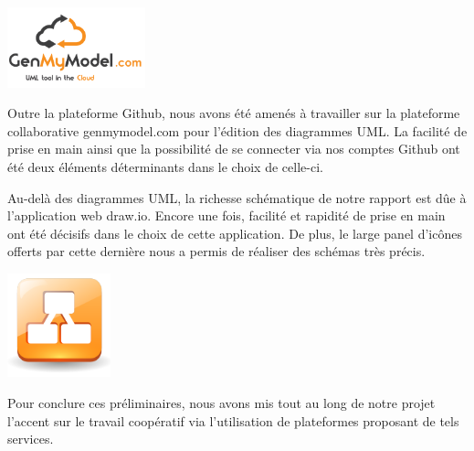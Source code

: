 \vskip 0.5cm

\begin{minipage}{0.30\linewidth}
\centering
  \includegraphics[width=4cm]{images/logos/genmymodel.png}
\end{minipage}\hfill
\begin{minipage}{0.65\linewidth}
\par Outre la plateforme Github, nous avons été amenés à travailler sur la plateforme collaborative genmymodel.com pour l'édition des diagrammes UML. La facilité de prise en main ainsi que la possibilité de se connecter via nos comptes Github ont été deux éléments déterminants dans le choix de celle-ci.
\end{minipage}

\vskip 0.5cm

\begin{minipage}{0.65\linewidth}
\par Au-delà des diagrammes UML, la richesse schématique de notre rapport est dûe à l'application web draw.io. Encore une fois, facilité et rapidité de prise en main ont été décisifs dans le choix de cette application. De plus, le large panel d'icônes offerts par cette dernière nous a permis de réaliser des schémas très précis.
\end{minipage}\hfill
\begin{minipage}{0.30\linewidth}
\centering
  \includegraphics[width=3cm]{images/logos/draw_io.png}
\end{minipage}

\vskip 0.5cm

\par Pour conclure ces préliminaires, nous avons mis tout au long de notre projet l'accent sur le travail coopératif via l'utilisation de plateformes proposant de tels services. 

